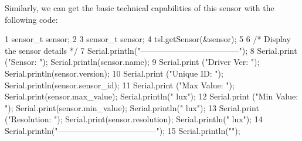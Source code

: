 Similarly, we can get the basic technical capabilities of this sensor with the following code\+:


\begin{DoxyCode}
1 sensor\_t sensor;
2 
3 sensor\_t sensor;
4 tsl.getSensor(&sensor);
5 
6 /* Display the sensor details */
7 Serial.println("------------------------------------");
8 Serial.print  ("Sensor:       "); Serial.println(sensor.name);
9 Serial.print  ("Driver Ver:   "); Serial.println(sensor.version);
10 Serial.print  ("Unique ID:    "); Serial.println(sensor.sensor\_id);
11 Serial.print  ("Max Value:    "); Serial.print(sensor.max\_value); Serial.println(" lux");
12 Serial.print  ("Min Value:    "); Serial.print(sensor.min\_value); Serial.println(" lux");
13 Serial.print  ("Resolution:   "); Serial.print(sensor.resolution); Serial.println(" lux");  
14 Serial.println("------------------------------------");
15 Serial.println("");
\end{DoxyCode}
 